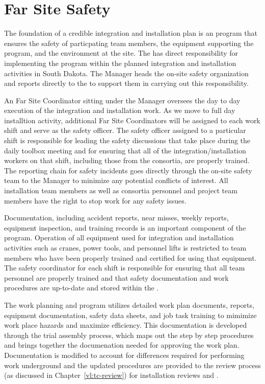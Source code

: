 \section{Far Site Safety}
\label{sec:far_site_safety}

The foundation of a credible integration and installation plan is 
an  program that ensures the safety of particpating team 
members, the equipment supporting the program, and the environment 
at the  site.  The  has direct responsibility 
for implementing the   program within 
the planned integration and installation activities in South Dakota.  
The   Manager heads the on-site safety 
organization and reports directly to the  to support them
in carrying out this responsibility.

An Far Site  Coordinator sitting under the
  Manager oversees the day to day
execution of the integration and installation work. As we move to full
day installtion activity, additional Far Site  Coordinators
will be assigned to each work shift and serve as the safety officer.
The safety officer assigned to a particular shift is responsible for
leading the safety discussions that take place during the daily
toolbox meeting and for ensuring that all of the
integration/installation workers on that shift, including those from
the consortia, are properly trained.  The reporting chain for safety
incidents goes directly through the on-site safety team to the
  Manager to minimize any potential
conflicts of interest.  All  installation team members as
well as  consortia personnel and  project team
members have the right to stop work for any safety issues.

Documentation, including accident reports, near misses, weekly reports, 
equipment inspection, and training records is an important component of 
the   program.  Operation of all equipment 
used for integration and installation activities such as cranes, power 
tools, and personnel lifts is restricted to team members who have been
properly trained and certified for using that equipment.  The safety 
coordinator for each shift is responsible for ensuring that all team 
personnel are properly trained and that safety documentation and work 
procedures are up-to-date and stored within the .  

The work planning and  program utilizes detailed work plan
documents,  reports, equipment documentation, safety data
sheets,  and job task training to mimimize work place
hazards and maximize efficiency.  This documentation is developed
through the  trial assembly process, which maps out
the step by step procedures and brings together the documenation
needed for approving the work plan.  Documentation is modified to
account for differences required for performing work underground and
the updated procedures are provided to the review process (as
discussed in Chapter~\ref{vl:tc-review}) for installation reviews and
.


